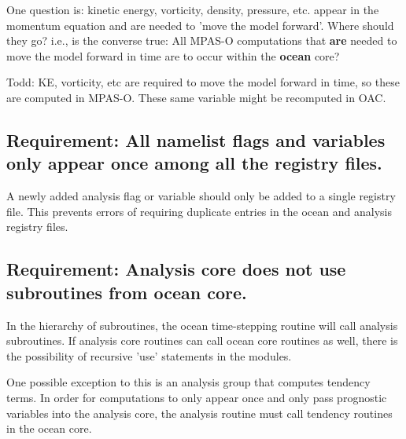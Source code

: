 \documentclass[11pt]{report}
\begin{document}
One question is: kinetic energy, vorticity, density, pressure, etc. appear in the momentum equation and are needed to 'move the model forward'.  Where should they go?  i.e., is the converse true: All MPAS-O computations that {\bf are} needed to move the model forward in time are to occur within the {\bf ocean} core?

Todd: KE, vorticity, etc are required to move the model forward in time, so these are computed in MPAS-O. These same variable might be recomputed in OAC.

\subsection{{\color{green} Requirement:} All namelist flags and variables only appear once among all the registry files.}
A newly added analysis flag or variable should only be added to a single registry file.  This prevents errors of requiring duplicate entries in the ocean and analysis registry files.

\subsection{{\color{red} Requirement:} Analysis core does not use subroutines from ocean core.}
In the hierarchy of subroutines, the ocean time-stepping routine will call analysis subroutines.  If analysis core routines can call ocean core routines as well, there is the possibility of recursive 'use' statements in the modules.

One possible exception to this is an analysis group that computes tendency terms.  In order for computations to only appear once and only pass prognostic variables into the analysis core, the analysis routine must call tendency routines in the ocean core.




\end{document}
